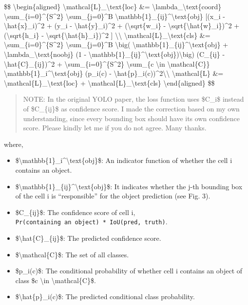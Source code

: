 \$\$ \textbackslash begin\{aligned\} \textbackslash mathcal\{L\}\_\textbackslash text\{loc\} \&= \textbackslash lambda\_\textbackslash text\{coord\} \textbackslash sum\_\{i=0\}\^{}\{S\^{}2\} \textbackslash sum\_\{j=0\}\^{}B \textbackslash mathbb\{1\}\_\{ij\}\^{}\textbackslash text\{obj\} {[}(x\_i - \textbackslash hat\{x\}\_i)\^{}2 + (y\_i - \textbackslash hat\{y\}\_i)\^{}2 + (\textbackslash sqrt\{w\_i\} - \textbackslash sqrt\{\textbackslash hat\{w\}\_i\})\^{}2 + (\textbackslash sqrt\{h\_i\} - \textbackslash sqrt\{\textbackslash hat\{h\}\_i\})\^{}2 {]} \textbackslash\textbackslash{} \textbackslash mathcal\{L\}\_\textbackslash text\{cls\} \&= \textbackslash sum\_\{i=0\}\^{}\{S\^{}2\} \textbackslash sum\_\{j=0\}\^{}B \textbackslash big( \textbackslash mathbb\{1\}\_\{ij\}\^{}\textbackslash text\{obj\} + \textbackslash lambda\_\textbackslash text\{noobj\} (1 - \textbackslash mathbb\{1\}\_\{ij\}\^{}\textbackslash text\{obj\})\textbackslash big) (C\_\{ij\} - \textbackslash hat\{C\}\_\{ij\})\^{}2 + \textbackslash sum\_\{i=0\}\^{}\{S\^{}2\} \textbackslash sum\_\{c \textbackslash in \textbackslash mathcal\{C\}\} \textbackslash mathbb\{1\}\_i\^{}\textbackslash text\{obj\} (p\_i(c) - \textbackslash hat\{p\}\_i(c))\^{}2\textbackslash\textbackslash{} \textbackslash mathcal\{L\} \&= \textbackslash mathcal\{L\}\_\textbackslash text\{loc\} + \textbackslash mathcal\{L\}\_\textbackslash text\{cls\} \textbackslash end\{aligned\} \$\$

\begin{quote}
NOTE: In the original YOLO paper, the loss function uses \$C\_i\$ instead of \$C\_\{ij\}\$ as confidence score. I made the correction based on my own understanding, since every bounding box should have its own confidence score. Please kindly let me if you do not agree. Many thanks.
\end{quote}

where,

\begin{itemize}
\tightlist
\item
  \$\textbackslash mathbb\{1\}\_i\^{}\textbackslash text\{obj\}\$: An indicator function of whether the cell i contains an object.
\item
  \$\textbackslash mathbb\{1\}\_\{ij\}\^{}\textbackslash text\{obj\}\$: It indicates whether the j-th bounding box of the cell i is ``responsible'' for the object prediction (see Fig. 3).
\item
  \$C\_\{ij\}\$: The confidence score of cell i, \texttt{Pr(containing\ an\ object)\ *\ IoU(pred,\ truth)}.
\item
  \$\textbackslash hat\{C\}\_\{ij\}\$: The predicted confidence score.
\item
  \$\textbackslash mathcal\{C\}\$: The set of all classes.
\item
  \$p\_i(c)\$: The conditional probability of whether cell i contains an object of class \$c \textbackslash in \textbackslash mathcal\{C\}\$.
\item
  \$\textbackslash hat\{p\}\_i(c)\$: The predicted conditional class probability.
\end{itemize}

